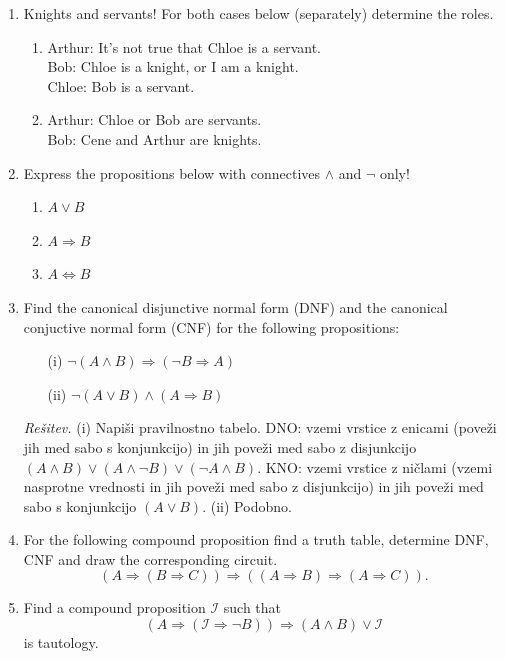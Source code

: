 \documentclass[11pt,paper=b5,footinclude,headinclude]{scrbook} %
\theoremstyle{remark}
\theoremstyle{definition} %
\theoremstyle{theorem} %
\begin{document}
\begin{enumerate}
\begin{enumerate}
\end{enumerate}
\item Knights and servants! For both cases below (separately) determine
the roles.
\begin{enumerate}
\item Arthur: It's not true that Chloe is a servant.\\
Bob: Chloe is a knight, or I am a knight.\\
Chloe: Bob is a servant.
\item Arthur: Chloe or Bob are servants.\\
Bob: Cene and Arthur are knights.
\end{enumerate}
\item Express the propositions below with connectives $\wedge$ and $\neg$
only!
\begin{enumerate}
\item $A\vee B$
\item $A\Rightarrow B$
\item $A\Leftrightarrow B$
\end{enumerate}


\item Find the canonical disjunctive normal form (DNF) and the canonical conjuctive normal form (CNF) for the following propositions:
\begin{enumerate}
\item[(i)] $\neg(A\wedge B) \Rightarrow (\neg B \Rightarrow A)$
\item[(ii)] $\neg (A\vee B) \wedge (A \Rightarrow B)$
\end{enumerate}

\emph{Rešitev.} (i) Napiši pravilnostno tabelo. DNO: vzemi vrstice z enicami (poveži jih med sabo s konjunkcijo) in jih poveži med sabo z disjunkcijo
$(A\wedge B) \vee (A\wedge \neg B) \vee (\neg A \wedge B)$. KNO: vzemi vrstice z ničlami (vzemi nasprotne vrednosti in jih poveži med sabo z disjunkcijo) in jih poveži med sabo s konjunkcijo $(A \vee B)$. (ii) Podobno.

\item For the following compound proposition find  a truth table, determine DNF, CNF and draw the corresponding circuit.
$$
(A \Rightarrow (B\Rightarrow C)) \Rightarrow ((A\Rightarrow B)\Rightarrow (A \Rightarrow C)).
$$


\item Find a compound proposition $\mathcal{I}$ such that
$$(A\Rightarrow (\mathcal{I} \Rightarrow \neg B))\Rightarrow (A\wedge B) \vee \mathcal{I}$$
is tautology.


\end{enumerate}
\end{document}
